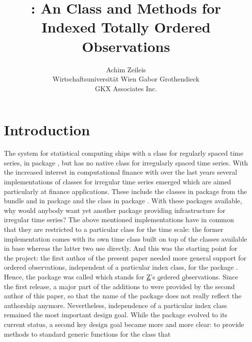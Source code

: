 \documentclass{Z}
\author{Achim Zeileis\\Wirtschaftsuniversit\"at Wien \And
        Gabor Grothendieck\\GKX Associates Inc.}
\title{\pkg{zoo}: An \proglang{S3} Class and Methods for
  Indexed Totally Ordered Observations}
\begin{document}



\section{Introduction} \label{sec:intro}

The  system for statistical computing
\citep[\url{http://www.R-project.org/}]{zoo:R:2005}
ships with a class for regularly spaced time series,
 in package , but has no native class for
irregularly spaced time series. With the increased interest in
computational finance with  over the last years
several implementations of classes for irregular time series 
emerged which are aimed particularly at finance applications.
These include the  classes 
in package  from the  bundle \citep{zoo:fCalendar:2004}
and  in package  \citep{zoo:tseries:2005}
and the  class  in package  \citep{zoo:its:2004}.
With these packages available, why would anybody want yet another 
package providing infrastructure for irregular time series?
The above mentioned implementations have in common that they are restricted to a particular
class for the time scale: the former implementation comes with its own time class
 built on top of the  classes
available in base  whereas the latter two use  directly.
And this was the starting point for the  project: the first author
of the present paper needed
more general support for ordered observations, independent of a particular
index class, for the package 
\citep{zoo:Zeileis+Leisch+Hornik:2002}. Hence, the package was called
 which stands for \underline{Z}'s \underline{o}rdered \underline{o}bservations.
Since the first release, a major part of the additions to 
were provided by the second author of this paper, so that the name
of the package does not really reflect the authorship anymore.
Nevertheless, independence of a particular index class remained
the most important design goal. While the package evolved to its current
status, a second key design goal became more and more clear: to provide
methods to standard generic functions for the  class that 
\end{document}
